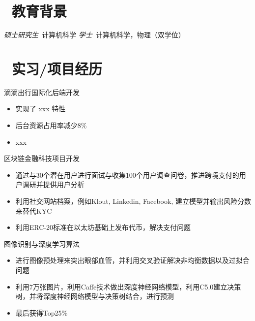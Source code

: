 \documentclass{resume}
\begin{document}


 
\section{\faGraduationCap\  教育背景}
\textit{硕士研究生}\ 计算机科学
\textit{学士}\ 计算机科学，物理（双学位）

\section{\faUsers\ 实习/项目经历}
\role{软件开发工程师}{工作经历}
滴滴出行国际化后端开发
\begin{itemize}
  \item 实现了 xxx 特性
  \item 后台资源占用率减少8\%
  \item xxx
\end{itemize}

\begin{onehalfspacing}
区块链金融科技项目开发
\begin{itemize}
  \item 通过与30个潜在用户进行面试与收集100个用户调查问卷，推进跨境支付的用户调研并提供用户分析
  \item 利用社交网站档案，例如Klout, Linkedin, Facebook, 建立模型并输出风险分数来替代KYC
  \item 利用ERC-20标准在以太坊基础上发布代币，解决支付问题
\end{itemize}
\end{onehalfspacing}

\begin{onehalfspacing}
图像识别与深度学习算法
\begin{itemize}
  \item 进行图像预处理来突出眼部血管，并利用交叉验证解决非均衡数据以及过拟合问题
  \item 利用7万张图片，利用Caffe技术做出深度神经网络模型，利用C5.0建立决策树，并将深度神经网络模型与决策树结合，进行预测
  \item 最后获得Top25\%
\end{itemize}
\end{onehalfspacing}
\end{document}
